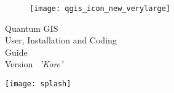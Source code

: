 \begin{titlepage}
\begin{center}

\begin{figure}[H]
\begin{center}
\texttt{[image: qgis\_icon\_new\_verylarge]} 
\end{center}
\end{figure}

\Huge{Quantum GIS}\\
\vspace{0.5cm}
\Large{User, Installation and Coding \\Guide} \\
\vspace{0.5cm}
\large{Version ~\CURRENT \textsl{'Kore'}}

\texttt{[image: splash]} 

\end{center}
\end{titlepage}
